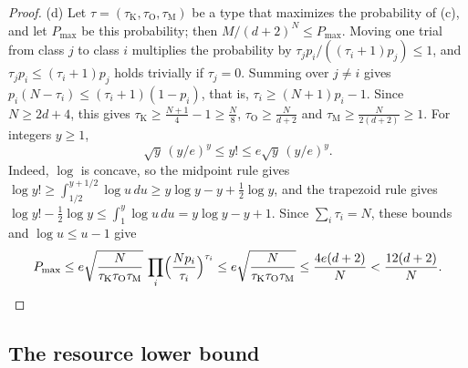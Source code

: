 \begin{proof}
(d) Let \(\tau=(\tau_{\mathrm K},\tau_{\mathrm O},\tau_{\mathrm M})\) be a
type that maximizes the probability of (c), and let \(P_{\max}\) be this
probability; then \(M/(d+2)^N\le P_{\max}\). Moving one trial from class
\(j\) to class \(i\) multiplies the probability by
\(\tau_jp_i/((\tau_i+1)p_j)\le1\), and \(\tau_jp_i\le(\tau_i+1)p_j\) holds
trivially if \(\tau_j=0\). Summing over \(j\ne i\) gives
\(p_i(N-\tau_i)\le(\tau_i+1)(1-p_i)\), that is,
\(\tau_i\ge(N+1)p_i-1\). Since \(N\ge2d+4\), this gives
\(\tau_{\mathrm K}\ge\frac{N+1}4-1\ge\frac N8\),
\(\tau_{\mathrm O}\ge\frac N{d+2}\) and
\(\tau_{\mathrm M}\ge\frac N{2(d+2)}\ge1\). For integers \(y\ge1\),
\[
 \sqrt y\,(y/e)^y\le y!\le e\sqrt y\,(y/e)^y .
\]
Indeed, \(\log\) is concave, so the midpoint rule gives
\(\log y!\ge\int_{1/2}^{y+1/2}\log u\,du\ge y\log y-y+\frac12\log y\), and
the trapezoid rule gives
\(\log y!-\frac12\log y\le\int_1^y\log u\,du=y\log y-y+1\). Since
\(\sum_i\tau_i=N\), these bounds and \(\log u\le u-1\) give
\[
 P_{\max}\le e\sqrt{\frac N{\tau_{\mathrm K}\tau_{\mathrm O}\tau_{\mathrm M}}}\,
 \prod_i\Bigl(\frac{Np_i}{\tau_i}\Bigr)^{\tau_i}
 \le e\sqrt{\frac N{\tau_{\mathrm K}\tau_{\mathrm O}\tau_{\mathrm M}}}
 \le\frac{4e(d+2)}N<\frac{12(d+2)}N .\qedhere
\]
\end{proof}

\subsection{The resource lower bound}
\label{subsec:lower-main-proof}

